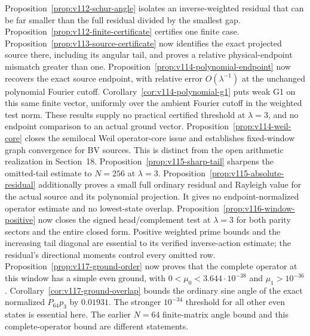 \documentclass[11pt]{article}
\theoremstyle{remark}
\begin{document}
Proposition~\ref{prop:v112-schur-angle} isolates an inverse-weighted
residual that can be far smaller than the full residual divided by the
smallest gap. Proposition~\ref{prop:v112-finite-certificate} certifies
one finite case. Proposition~\ref{prop:v113-source-certificate} now
identifies the exact projected source there, including its angular tail,
and proves a relative physical-endpoint mismatch greater than one.
Proposition~\ref{prop:v114-polynomial-endpoint} now recovers the exact
source endpoint, with relative error $O(\lambda^{-1})$ at the unchanged
polynomial Fourier cutoff. Corollary~\ref{cor:v114-polynomial-g1}
puts weak G1 on this same finite vector, uniformly over the ambient
Fourier cutoff in the weighted test norm. These results supply no
practical certified threshold
at $\lambda=3$, and no endpoint comparison to an actual ground vector.
Proposition~\ref{prop:v114-weil-core} closes the semilocal Weil
operator-core issue and establishes fixed-window graph convergence for
BV sources. This is distinct from the open arithmetic realization in
Section~18. Proposition~\ref{prop:v115-sharp-tail} sharpens the omitted-tail
estimate to $N=256$ at $\lambda=3$. Proposition~\ref{prop:v115-absolute-residual}
additionally proves a small full ordinary residual and Rayleigh value
for the actual source and its polynomial projection. It gives no
endpoint-normalized operator estimate and no lowest-state overlap.
Proposition~\ref{prop:v116-window-positive} now closes the signed
head/complement test at $\lambda=3$ for both parity sectors and the
entire closed form. Positive weighted prime bounds and the increasing
tail diagonal are essential to its verified inverse-action estimate;
the residual's directional moments control every omitted row.
Proposition~\ref{prop:v117-ground-order} now proves that the complete
operator at this window has a simple even ground, with
$0<\mu_0<3.644\cdot10^{-38}$ and $\mu_1>10^{-36}$.
Corollary~\ref{cor:v117-ground-overlap} bounds the ordinary sine angle
of the exact normalized $P_{64}p_3$ by $0.01931$. The stronger
$10^{-34}$ threshold for all other even states is essential here.
The earlier $N=64$ finite-matrix angle bound and this complete-operator
bound are different statements.
\end{document}
